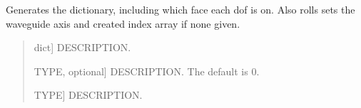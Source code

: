 \documentclass[letterpaper,10pt,english]{sphinxmanual}
\begin{document}
\begin{fulllineitems}
\label{\detokenize{core:pywfe.core.model_setup.generate_dof_info}}
\pysigstartsignatures
{}
\pysigstopsignatures
\sphinxAtStartPar
Generates the  dictionary, including which face each dof is on.
Also rolls sets the waveguide axis and created index array if none given.
\begin{quote}\begin{description}
\begin{description}
\sphinxlineitem{\sphinxstylestrong{dof}}{[}dict{]}
\sphinxAtStartPar
DESCRIPTION.

\sphinxlineitem{\sphinxstylestrong{axis}}{[}TYPE, optional{]}
\sphinxAtStartPar
DESCRIPTION. The default is 0.

\end{description}

\begin{description}
\sphinxlineitem{\sphinxstylestrong{dof}}{[}TYPE{]}
\sphinxAtStartPar
DESCRIPTION.

\end{description}

\end{description}\end{quote}

\end{fulllineitems}

\end{document}
